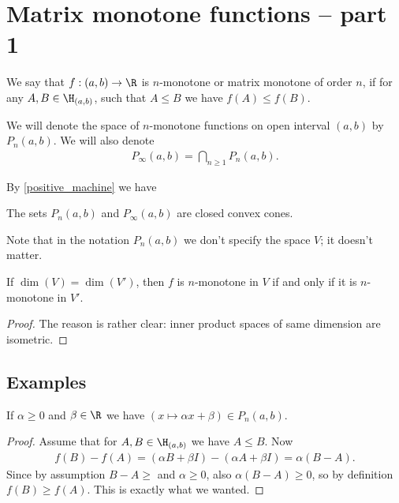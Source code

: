 \chapter{Matrix monotone functions -- part 1}

\begin{maar}\label{n_mon_maar}
	We say that $f : (a, b) \to \R$ is $n$-monotone or matrix monotone of order $n$, if for any $A, B \in \H_{(a, b)}$, such that $A \leq B$ we have $f(A) \leq f(B)$.
\end{maar}

We will denote the space of $n$-monotone functions on open interval $(a, b)$ by $P_{n}(a, b)$. We will also denote
\begin{align*}
	P_{\infty}(a, b) = \bigcap_{n \geq 1} P_{n}(a, b).
\end{align*}

By \ref{positive_machine} we have

\begin{prop}
	The sets $P_{n}(a, b)$ and $P_{\infty}(a, b)$ are closed convex cones.
\end{prop}

Note that in the notation $P_{n}(a, b)$ we don't specify the space $V$; it doesn't matter.

\begin{prop}
	If $\dim(V) = \dim(V')$, then $f$ is $n$-monotone in $V$ if and only if it is $n$-monotone in $V'$.
\end{prop}
\begin{proof}
	The reason is rather clear: inner product spaces of same dimension are isometric.
\end{proof}

\section{Examples}

\begin{esim}
	If $\alpha \geq 0$ and $\beta \in \R$ we have $(x \mapsto \alpha x + \beta) \in P_{n}(a, b)$.
\end{esim}
\begin{proof}
	Assume that for $A, B \in \H_{(a, b)}$ we have $A \leq B$. Now
	\begin{align*}
		f(B) - f(A) = (\alpha B + \beta I) - (\alpha A + \beta I) = \alpha (B - A).
	\end{align*}
	Since by assumption $B - A \geq $ and $\alpha \geq 0$, also $\alpha (B - A) \geq 0$, so by definition $f(B) \geq f(A)$. This is exactly what we wanted.
\end{proof}

